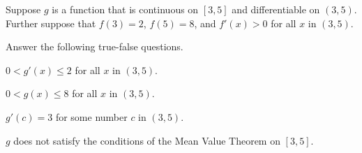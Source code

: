 \documentclass{ximera}
\author{Nela Lakos \and Kyle Parsons}
\begin{document}
\begin{exercise}

Suppose $g$ is a function that is continuous on $[3,5]$ and differentiable on $(3,5)$.  Further suppose that $f(3)=2$, $f(5)=8$, and $f'(x)>0$ for all $x$ in $(3,5)$.

Answer the following true-false questions.

$0<g'(x)\leq2$ for all $x$ in $(3,5)$.
\begin{multipleChoice}
\end{multipleChoice}

$0<g(x)\leq8$ for all $x$ in $(3,5)$.
\begin{multipleChoice}
\end{multipleChoice}

$g'(c)=3$ for some number $c$ in $(3,5)$.
\begin{multipleChoice}
\end{multipleChoice}

$g$ does not satisfy the conditions of the Mean Value Theorem on $[3,5]$.
\begin{multipleChoice}
\end{multipleChoice}

\end{exercise}
\end{document}
